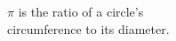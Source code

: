 \documentclass[preview]{standalone}
\begin{document}
\begin{center}
$\pi$ is the ratio of a circle's \\ circumference to its diameter.
\end{center}
\end{document}
